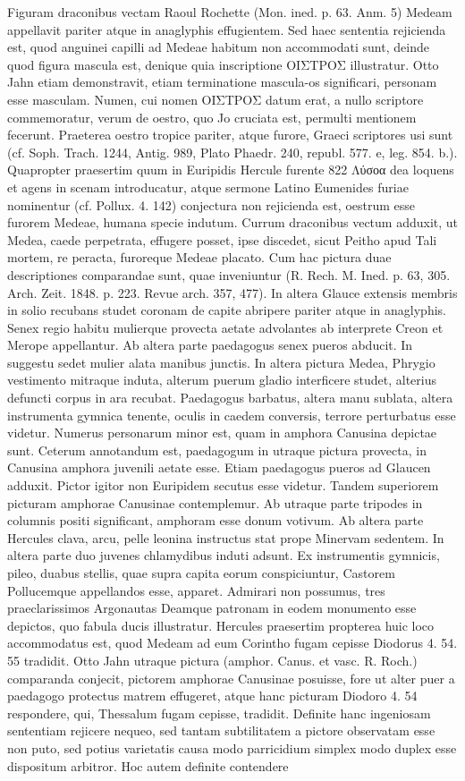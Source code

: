 \documentclass[landscape, a4paper, 11pt, oneside, polutonikogreek, german]{article}
\begin{document}
Figuram draconibus vectam Raoul Rochette (Mon. ined. p. 63. Anm. 5) Medeam appellavit pariter atque in anaglyphis effugientem. Sed haec sententia rejicienda est, quod anguinei capilli ad Medeae habitum non accommodati sunt, deinde quod figura mascula est, denique quia inscriptione ΟΙΣΤΡΟΣ illustratur. Otto Jahn etiam demonstravit, etiam terminatione mascula-os significari, personam esse masculam. Numen, cui nomen ΟΙΣΤΡΟΣ datum erat, a nullo scriptore commemoratur, verum de oestro, quo Jo cruciata est, permulti mentionem fecerunt. Praeterea oestro tropice pariter, atque furore, Graeci scriptores usi sunt (cf. Soph. Trach. 1244, Antig. 989, Plato Phaedr. 240, republ. 577. e, leg. 854. b.). Quapropter praesertim quum in Euripidis Hercule furente 822 Λύσοα dea loquens et agens in scenam introducatur, atque sermone Latino Eumenides furiae nominentur (cf. Pollux. 4. 142) conjectura non rejicienda est, oestrum esse furorem Medeae, humana specie indutum. Currum draconibus vectum adduxit, ut Medea, caede perpetrata, effugere posset, ipse discedet, sicut Peitho apud Tali mortem, re peracta, furoreque Medeae placato. Cum hac pictura duae descriptiones comparandae sunt, quae inveniuntur (R. Rech. M. Ined. p. 63, 305. Arch. Zeit. 1848. p. 223. Revue arch. 357, 477). In altera Glauce extensis membris in solio recubans studet coronam de capite abripere pariter atque in anaglyphis. Senex regio habitu mulierque provecta aetate advolantes ab interprete Creon et Merope appellantur. Ab altera parte paedagogus senex pueros abducit. In suggestu sedet mulier alata manibus junctis. In altera pictura Medea, Phrygio vestimento mitraque induta, alterum puerum gladio interficere studet, alterius defuncti corpus in ara recubat. Paedagogus barbatus, altera manu sublata, altera instrumenta gymnica tenente, oculis in caedem conversis, terrore perturbatus esse videtur. Numerus personarum minor est, quam in amphora Canusina depictae sunt. Ceterum annotandum est, paedagogum in utraque pictura provecta, in Canusina amphora juvenili aetate esse. Etiam paedagogus pueros ad Glaucen adduxit. Pictor igitor non Euripidem secutus esse videtur. Tandem superiorem picturam amphorae Canusinae contemplemur. Ab utraque parte tripodes in columnis positi significant, amphoram esse donum votivum. Ab altera parte Hercules clava, arcu, pelle leonina instructus stat prope Minervam sedentem. In altera parte duo juvenes chlamydibus induti adsunt. Ex instrumentis gymnicis, pileo, duabus stellis, quae supra capita eorum conspiciuntur, Castorem Pollucemque appellandos esse, apparet. Admirari non possumus, tres praeclarissimos Argonautas Deamque patronam in eodem monumento esse depictos, quo fabula ducis illustratur. Hercules praesertim propterea huic loco accommodatus est, quod Medeam ad eum Corintho fugam cepisse Diodorus 4. 54. 55 tradidit. Otto Jahn utraque pictura (amphor. Canus. et vasc. R. Roch.) comparanda conjecit, pictorem amphorae Canusinae posuisse, fore ut alter puer a paedagogo protectus matrem effugeret, atque hanc picturam Diodoro 4. 54 respondere, qui, Thessalum fugam cepisse, tradidit. Definite hanc ingeniosam sententiam rejicere nequeo, sed tantam subtilitatem a pictore observatam esse non puto, sed potius varietatis causa modo parricidium simplex modo duplex esse dispositum arbitror. Hoc autem definite contendere 
\end{document}
